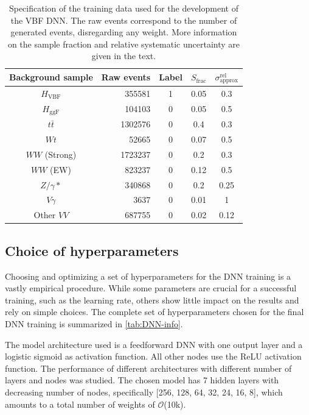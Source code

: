 \begin{table}[h]
    \centering
    \small
    \begin{tabular}{ c  | r c c c}
    \toprule
    Background sample & Raw events & Label & $S_\text{frac}$ & $\sigma^\text{rel}_\text{approx}$ \\
    \midrule
    $H_{\mathrm{VBF}}$ & 355581 & 1 & 0.05 & 0.3 \\ 
    $H_{\mathrm{ggF}}$ & 104103 & 0 & 0.05 & 0.5 \\ 
    $t\bar{t}$ & 1302576 & 0 & 0.4  & 0.3 \\
    $Wt$ & 52665 & 0 & 0.07 & 0.5 \\
    $WW$ (Strong) & 1723237 & 0& 0.2 & 0.3 \\
    $WW$ (EW) & 823237 & 0 & 0.12 & 0.5 \\
    $Z/\gamma*$ & 340868 & 0& 0.2 & 0.25\\
    $V\gamma$ & 3637 & 0 & 0.01 & 1 \\
    Other $VV$ & 687755 & 0 & 0.02 & 0.12 \\
    \bottomrule
    \end{tabular}
    \caption{Specification of the training data used for the development of the VBF DNN. The raw events correspond to the number of generated events, disregarding any weight. More information on the sample fraction and relative systematic uncertainty are given in the text.}
    \label{tab:DNNtrainingstats}
\end{table}


\subsection{Choice of hyperparameters}
\label{subsec:hyper-parameters}
Choosing and optimizing a set of hyperparameters for the DNN training is a vastly empirical procedure.
While some parameters are crucial for a successful training, such as the learning rate, others show little impact on the results and rely on simple choices. 
The complete set of hyperparameters chosen for the final DNN training is summarized in \cref{tab:DNN-info}. 

The model architecture used is a feedforward DNN with one output layer and a logistic sigmoid as activation function. All other nodes use the ReLU activation function. 
The performance of different architectures with different number of layers and nodes was studied. The chosen model has 7 hidden layers with decreasing number of nodes, specifically [256, 128, 64, 32, 24, 16, 8], which amounts to a total number of weights of $\mathcal{O}$(10k). 

